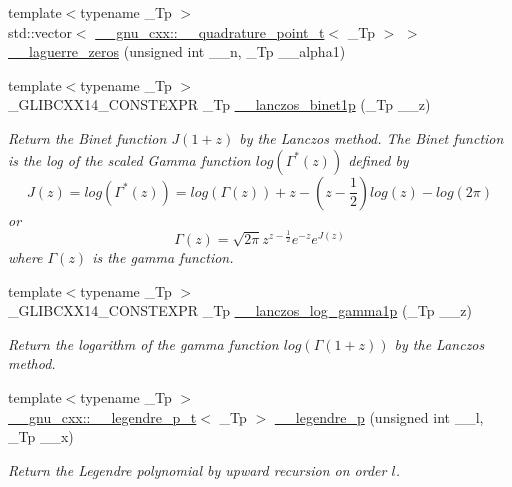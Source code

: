 \begin{DoxyCompactItemize}
{\footnotesize template$<$typename \+\_\+\+Tp $>$ }\\std\+::vector$<$ \hyperlink{struct____gnu__cxx_1_1____quadrature__point__t}{\+\_\+\+\_\+gnu\+\_\+cxx\+::\+\_\+\+\_\+quadrature\+\_\+point\+\_\+t}$<$ \+\_\+\+Tp $>$ $>$ \hyperlink{namespacestd_1_1____detail_a12f5145d6544afee991b30a30020e86b}{\+\_\+\+\_\+laguerre\+\_\+zeros} (unsigned int \+\_\+\+\_\+n, \+\_\+\+Tp \+\_\+\+\_\+alpha1)
\item 
{\footnotesize template$<$typename \+\_\+\+Tp $>$ }\\\+\_\+\+G\+L\+I\+B\+C\+X\+X14\+\_\+\+C\+O\+N\+S\+T\+E\+X\+PR \+\_\+\+Tp \hyperlink{namespacestd_1_1____detail_a84722b82d6d614aa4653eb7559f7d508}{\+\_\+\+\_\+lanczos\+\_\+binet1p} (\+\_\+\+Tp \+\_\+\+\_\+z)
\begin{DoxyCompactList}\small\item\em Return the Binet function $ J(1+z) $ by the Lanczos method. The Binet function is the log of the scaled Gamma function $ log(\Gamma^*(z)) $ defined by \[ J(z) = log(\Gamma^*(z)) = log\left(\Gamma(z)\right) + z - \left(z-\frac{1}{2}\right) log(z) - log(2\pi) \] or \[ \Gamma(z) = \sqrt{2\pi}z^{z-\frac{1}{2}}e^{-z}e^{J(z)} \] where $ \Gamma(z) $ is the gamma function. \end{DoxyCompactList}\item 
{\footnotesize template$<$typename \+\_\+\+Tp $>$ }\\\+\_\+\+G\+L\+I\+B\+C\+X\+X14\+\_\+\+C\+O\+N\+S\+T\+E\+X\+PR \+\_\+\+Tp \hyperlink{namespacestd_1_1____detail_a4586aeea80ba556ab8d6393dadb05c5c}{\+\_\+\+\_\+lanczos\+\_\+log\+\_\+gamma1p} (\+\_\+\+Tp \+\_\+\+\_\+z)
\begin{DoxyCompactList}\small\item\em Return the logarithm of the gamma function $ log(\Gamma(1+z)) $ by the Lanczos method. \end{DoxyCompactList}\item 
{\footnotesize template$<$typename \+\_\+\+Tp $>$ }\\\hyperlink{struct____gnu__cxx_1_1____legendre__p__t}{\+\_\+\+\_\+gnu\+\_\+cxx\+::\+\_\+\+\_\+legendre\+\_\+p\+\_\+t}$<$ \+\_\+\+Tp $>$ \hyperlink{namespacestd_1_1____detail_ab06b50bbac9758b5a2cc7d3d8213daa9}{\+\_\+\+\_\+legendre\+\_\+p} (unsigned int \+\_\+\+\_\+l, \+\_\+\+Tp \+\_\+\+\_\+x)
\begin{DoxyCompactList}\small\item\em Return the Legendre polynomial by upward recursion on order $ l $. \end{DoxyCompactList}\item 

\end{DoxyCompactItemize}

